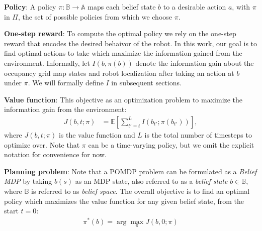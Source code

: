 \documentclass[letterpaper, 10 pt, conference]{ieeeconf}  %
\newcommand{\ph}[1]{{\textbf{#1}:}} %
\newcommand{\note}[1]{{\color{cyan} NOTE: #1 }}
\begin{document}
\ph{Policy}
A policy $\pi : \mathbb{B} \rightarrow \mathbb{A}$ maps each belief state $b$ to a desirable action $a$, with $\pi$ in $\Pi$, the set of possible policies from which we choose $\pi$.



\ph{One-step reward}
To compute the optimal policy we rely on the one-step reward that encodes the desired behaivor of the robot. In this work, our goal is to find optimal actions to take which maximize the information gained from the environment. Informally, let $I(b, \pi(b))$ denote the information gain about the occupancy grid map states and robot localization after taking an action at $b$ under $\pi$.  We will formally define $I$ in subsequent sections.

\ph{Value function}
This objective as an optimization problem to maximize the information gain from the environment:
\begin{align}
  J(b,t;\pi) &= \mathbb{E} \left[ \sum_{t'=t}^{L} I(b_{t'}; \pi(b_{t'})) \right], \label{eq:artifactopt_cost}
\end{align}
where $J(b,t;\pi)$ is the value function and $L$ is the total number of timesteps to optimize over.  Note that $\pi$ can be a time-varying policy, but we omit the explicit notation for convenience for now.
 
\ph{Planning problem}
Note that a POMDP problem can be formulated as a \textit{Belief MDP} by taking $b(s)$ as an MDP state, also referred to as a \textit{belief state} $b \in \mathbb{B}$, where $\mathbb{B}$ is referred to as \textit{belief space}.  The overall objective is to find an optimal policy which maximizes the value function for any given belief state, from the start $t=0$:
\begin{align}
  \pi^*(b) = \arg\max_\pi J(b,0;\pi)
  \label{eq:MDP-belief}
\end{align}
\end{document}
